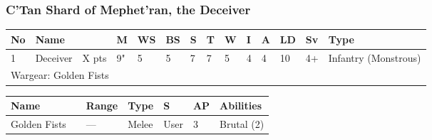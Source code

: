 \newpage
\subsubsection{C'Tan Shard of Mephet'ran, the Deceiver}

\noindent
\begin{tabular}{||m{10pt} m{95pt} m{30pt} m{11pt} m{11pt} m{11pt} m{11pt} m{11pt} m{11pt} m{11pt} m{11pt} m{11pt} m{11pt} m{125pt}||}
\hline
No & Name & & M & WS & BS & S & T & W & I & A & LD & Sv & Type \\
\hline
1 & Deceiver & X pts & 9" & 5 & 5 & 7 & 7 & 5 & 4 & 4 & 10 & 4+ & Infantry (Monstrous)\\
\hline
\hline
\multicolumn{14}{||Z{532 pt}||}{Wargear: Golden Fists}\\
\hline
\end{tabular}

\noindent
\begin{tabular}{||m{140pt} m{0pt} m{31pt} m{55pt} m{12pt} m{12pt} m{210pt}||}
\hline
Name & & Range & Type & S & AP & Abilities \\
\hline
Golden Fists &  & — & Melee & User & 3 & Brutal (2) \\
\hline
\end{tabular}

